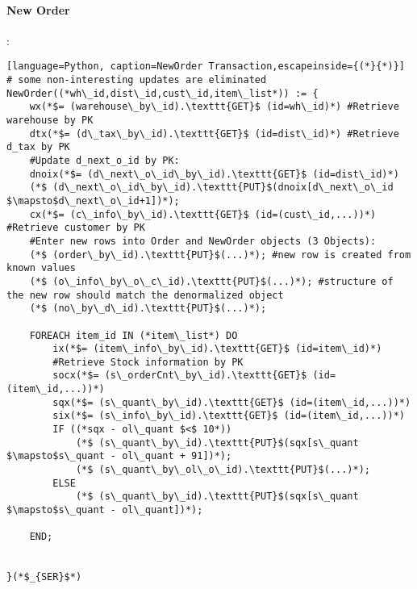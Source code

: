 \documentclass[12pt,letter]{article}
\begin{document}
\paragraph{New Order}:
\begin{lstlisting}[language=Python, caption=NewOrder Transaction,escapeinside={(*}{*)}]
# some non-interesting updates are eliminated
NewOrder((*wh\_id,dist\_id,cust\_id,item\_list*)) := {	
	wx(*$= (warehouse\_by\_id).\texttt{GET}$ (id=wh\_id)*) #Retrieve warehouse by PK
	dtx(*$= (d\_tax\_by\_id).\texttt{GET}$ (id=dist\_id)*) #Retrieve d_tax by PK
	#Update d_next_o_id by PK:
	dnoix(*$= (d\_next\_o\_id\_by\_id).\texttt{GET}$ (id=dist\_id)*) 
	(*$ (d\_next\_o\_id\_by\_id).\texttt{PUT}$(dnoix[d\_next\_o\_id $\mapsto$d\_next\_o\_id+1])*);
	cx(*$= (c\_info\_by\_id).\texttt{GET}$ (id=(cust\_id,...))*) #Retrieve customer by PK
	#Enter new rows into Order and NewOrder objects (3 Objects):
	(*$ (order\_by\_id).\texttt{PUT}$(...)*); #new row is created from known values
	(*$ (o\_info\_by\_o\_c\_id).\texttt{PUT}$(...)*); #structure of the new row should match the denormalized object
	(*$ (no\_by\_d\_id).\texttt{PUT}$(...)*);
	
	FOREACH item_id IN (*item\_list*) DO
		ix(*$= (item\_info\_by\_id).\texttt{GET}$ (id=item\_id)*)
		#Retrieve Stock information by PK
		socx(*$= (s\_orderCnt\_by\_id).\texttt{GET}$ (id=(item\_id,...))*)
		sqx(*$= (s\_quant\_by\_id).\texttt{GET}$ (id=(item\_id,...))*)
		six(*$= (s\_info\_by\_id).\texttt{GET}$ (id=(item\_id,...))*)
		IF ((*sqx - ol\_quant $<$ 10*))
			(*$ (s\_quant\_by\_id).\texttt{PUT}$(sqx[s\_quant $\mapsto$s\_quant - ol\_quant + 91])*);		
			(*$ (s\_quant\_by\_ol\_o\_id).\texttt{PUT}$(...)*);
		ELSE
			(*$ (s\_quant\_by\_id).\texttt{PUT}$(sqx[s\_quant $\mapsto$s\_quant - ol\_quant])*);		

	END;


}(*$_{SER}$*)
\end{lstlisting}















\newpage
\vspace{10mm}
\end{document}
